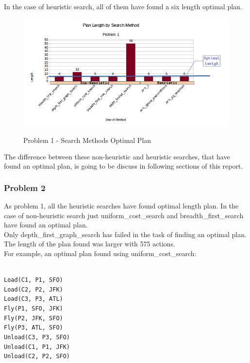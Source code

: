 \documentclass[10pt, a4paper,english]{article}
\begin{document}
In the case of heuristic search, all of them have found a six length optimal plan. \\

\begin{figure}[h]
\includegraphics[width=1\textwidth]{problem1.png}\\
\caption{Problem 1 - Search Methods Optimal Plan}
\end{figure}


The difference between these non-heuristic and heuristic searches, that have found an optimal plan, is going to be discuss in following sections of this report. \\

\subsubsection{Problem 2}

As problem 1, all the heuristic searches have found optimal length plan. In the case of non-heuristic search just uniform\_cost\_search and breadth\_first\_search have found an optimal plan. \\

Only depth\_first\_graph\_search has failed in the task of finding an optimal plan. The length of the plan found was larger with 575 actions. \\

For example, an optimal plan found using uniform\_cost\_search:

\indent \texttt{ \\
\indent Load(C1, P1, SFO) \\
\indent Load(C2, P2, JFK) \\
\indent Load(C3, P3, ATL) \\
\indent Fly(P1, SFO, JFK) \\
\indent Fly(P2, JFK, SFO) \\
\indent Fly(P3, ATL, SFO) \\
\indent Unload(C3, P3, SFO)\\
\indent Unload(C1, P1, JFK)\\
\indent Unload(C2, P2, SFO)\\
}
\end{document}
